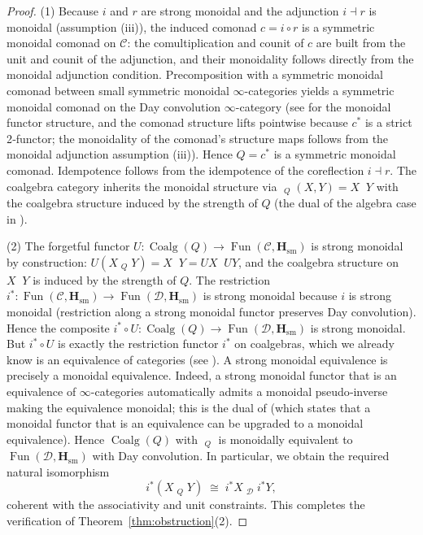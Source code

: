 \documentclass[12pt,a4paper]{article}
\theoremstyle{plain}
\theoremstyle{definition}
\DeclareMathOperator{\Coalg}{Coalg}
\DeclareMathOperator{\Fun}{Fun}
\DeclareMathOperator{\Day}{\otimes_{\mathrm{Day}}}
\begin{document}
\begin{proof}
(1) Because $i$ and $r$ are strong monoidal and the adjunction $i \dashv r$ is monoidal (assumption (iii)), the induced comonad $c = i \circ r$ is a symmetric monoidal comonad on $\mathcal{C}$: the comultiplication and counit of $c$ are built from the unit and counit of the adjunction, and their monoidality follows directly from the monoidal adjunction condition.  Precomposition with a symmetric monoidal comonad between small symmetric monoidal $\infty$-categories yields a symmetric monoidal comonad on the Day convolution $\infty$-category
(see \cite[Remark~2.2.6.9]{LurieHA} for the monoidal functor structure,
and the comonad structure lifts pointwise because $c^{*}$ is a strict 2‑functor;
the monoidality of the comonad’s structure maps follows from the monoidal adjunction assumption (iii)).
Hence $Q=c^{*}$ is a symmetric monoidal comonad.  Idempotence follows from the idempotence of the coreflection $i\dashv r$.  The coalgebra category inherits the monoidal structure via $\Day_Q(X,Y)=X\Day Y$ with the coalgebra structure induced by the strength of $Q$ (the dual of the algebra case in \cite{Benton1995}).

(2) The forgetful functor $U:\Coalg(Q)\to\Fun(\mathcal{C},\mathbf{H}_{\mathrm{sm}})$ is strong monoidal by construction: $U(X\Day_Q Y)=X\Day Y = UX\Day UY$, and the coalgebra structure on $X\Day Y$ is induced by the strength of $Q$.  The restriction $i^{*}:\Fun(\mathcal{C},\mathbf{H}_{\mathrm{sm}})\to\Fun(\mathcal{D},\mathbf{H}_{\mathrm{sm}})$ is strong monoidal because $i$ is strong monoidal (restriction along a strong monoidal functor preserves Day convolution).  Hence the composite $i^{*}\circ U : \Coalg(Q) \to \Fun(\mathcal{D},\mathbf{H}_{\mathrm{sm}})$ is strong monoidal.  But $i^{*}\circ U$ is exactly the restriction functor $i^{*}$ on coalgebras, which we already know is an equivalence of categories (see \cite{Woo2026}).  A strong monoidal equivalence is precisely a monoidal equivalence.
Indeed, a strong monoidal functor that is an equivalence of $\infty$-categories
automatically admits a monoidal pseudo‑inverse making the equivalence monoidal;
this is the dual of \cite[Proposition~2.1.3.8]{LurieHA}
(which states that a monoidal functor that is an equivalence can be upgraded to a monoidal equivalence).
Hence $\Coalg(Q)$ with $\Day_Q$ is monoidally equivalent to $\Fun(\mathcal{D},\mathbf{H}_{\mathrm{sm}})$ with Day convolution.
In particular, we obtain the required natural isomorphism
\[
i^{*}(X \Day_Q Y) \;\cong\; i^{*}X \Day_{\mathcal{D}} i^{*}Y,
\]
coherent with the associativity and unit constraints.  This completes the verification of Theorem~\ref{thm:obstruction}(2).


\end{proof}
\end{document}
